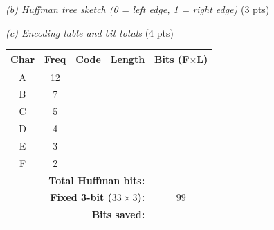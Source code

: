 \documentclass[12pt, addpoints]{exam}
\begin{document}
\noindent\textit{(b) Huffman tree sketch (0 = left edge, 1 = right edge)} \hfill (3 pts)

\vspace{144pt} %

\newpage
\noindent\textit{(c) Encoding table and bit totals} \hfill (4 pts)

\begin{center}
\renewcommand{\arraystretch}{1.5}
\begin{tabular}{|c|c|c|c|c|}
  \hline
  \textbf{Char} & \textbf{Freq} & \textbf{Code} & \textbf{Length} &
  \textbf{Bits (F$\times$L)}\\\hline
  A & 12 & & & \\\hline
  B &  7 & & & \\\hline
  C &  5 & & & \\\hline
  D &  4 & & & \\\hline
  E &  3 & & & \\\hline
  F &  2 & & & \\\hline
  \multicolumn{4}{|r|}{\textbf{Total Huffman bits:}}  & \\\hline
  \multicolumn{4}{|r|}{\textbf{Fixed 3-bit ($33\times3$):}} & 99 \\\hline
  \multicolumn{4}{|r|}{\textbf{Bits saved:}}  & \\\hline
\end{tabular}
\end{center}
\end{document}
